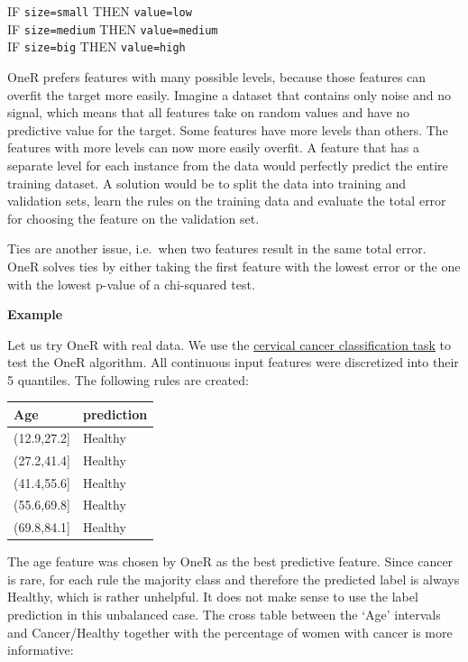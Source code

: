 \documentclass[
  11pt,
]{scrbook}
\begin{document}
IF \texttt{size=small} THEN \texttt{value=low}\\
IF \texttt{size=medium} THEN \texttt{value=medium}\\
IF \texttt{size=big} THEN \texttt{value=high}

OneR prefers features with many possible levels, because those features can overfit the target more easily.
Imagine a dataset that contains only noise and no signal, which means that all features take on random values and have no predictive value for the target.
Some features have more levels than others.
The features with more levels can now more easily overfit.
A feature that has a separate level for each instance from the data would perfectly predict the entire training dataset.
A solution would be to split the data into training and validation sets, learn the rules on the training data and evaluate the total error for choosing the feature on the validation set.

Ties are another issue, i.e.~when two features result in the same total error.
OneR solves ties by either taking the first feature with the lowest error or the one with the lowest p-value of a chi-squared test.

\textbf{Example}

Let us try OneR with real data.
We use the \protect\hyperlink{cervical}{cervical cancer classification task} to test the OneR algorithm.
All continuous input features were discretized into their 5 quantiles.
The following rules are created:

\begin{table}
\centering
\begin{tabular}{ll}
\toprule
Age & prediction\\
\midrule
(12.9,27.2] & Healthy\\
(27.2,41.4] & Healthy\\
(41.4,55.6] & Healthy\\
(55.6,69.8] & Healthy\\
(69.8,84.1] & Healthy\\
\bottomrule
\end{tabular}
\end{table}

The age feature was chosen by OneR as the best predictive feature.
Since cancer is rare, for each rule the majority class and therefore the predicted label is always Healthy, which is rather unhelpful.
It does not make sense to use the label prediction in this unbalanced case.
The cross table between the `Age' intervals and Cancer/Healthy together with the percentage of women with cancer is more informative:
\end{document}
